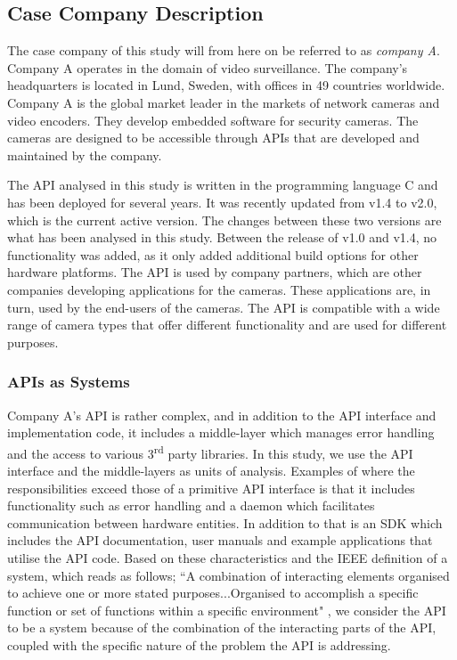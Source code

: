 \documentclass{sig-alternate}
\begin{document}
\subsection{Case Company Description} \label{case_company_description}
The case company of this study will from here on be referred to as \textit{company A}. Company A operates in the domain of video surveillance. The company's headquarters is located in Lund, Sweden, with offices in 49 countries worldwide. Company A is the global market leader in the markets of network cameras and video encoders. They develop embedded software for security cameras. The cameras are designed to be accessible through APIs that are developed and maintained by the company. 

The API analysed in this study is written in the programming language C and has been deployed for several years. It was recently updated from v1.4 to v2.0, which is the current active version. The changes between these two versions are what has been analysed in this study. Between the release of v1.0 and v1.4, no functionality was added, as it only added additional build options for other hardware platforms. The API is used by company partners, which are other companies developing applications for the cameras. These applications are, in turn, used by the end-users of the cameras. The API is compatible with a wide range of camera types that offer different functionality and are used for different purposes. 



\subsubsection{APIs as Systems}
Company A's API is rather complex, and in addition to the API interface and implementation code, it includes a middle-layer which manages error handling and the access to various 3\textsuperscript{rd} party libraries. In this study, we use the API interface and the middle-layers as units of analysis. Examples of where the responsibilities exceed those of a primitive API interface is that it includes functionality such as error handling and a daemon which facilitates communication between hardware entities. In addition to that is an SDK which includes the API documentation, user manuals and example applications that utilise the API code. Based on these characteristics and the IEEE definition of a system, which reads as follows; ``A combination of interacting elements organised to achieve one or more stated purposes...Organised to accomplish a specific function or set of functions within a specific environment" \cite{5733835 }, we consider the API to be a system because of the combination of the interacting parts of the API, coupled with the specific nature of the problem the API is addressing. 
\end{document}
